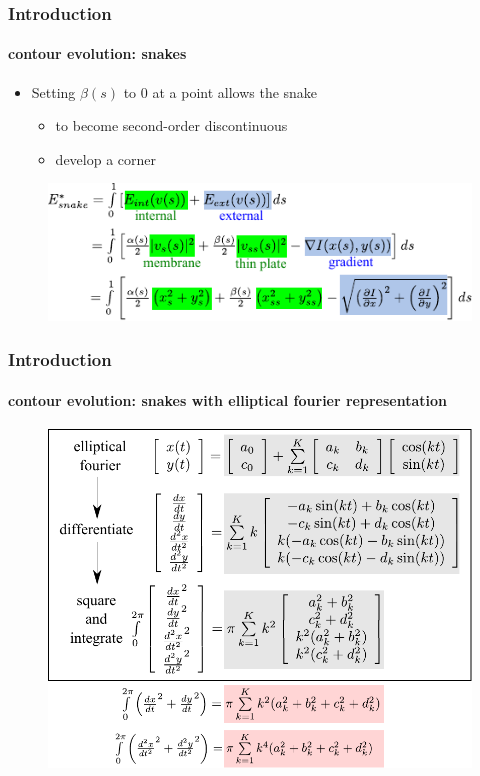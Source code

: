 \begin{frame}
\frametitle{Introduction}
\framesubtitle{contour evolution: snakes}
\logoCSIPCPL\mypagenum
	\begin{itemize}
		\item Setting $\beta(s)$ to 0 at a point allows the snake
			\begin{itemize}
				\item to become second-order discontinuous
				\item develop a corner
			\end{itemize}
	\end{itemize}
	\begin{figure}
		\includegraphics[width=1.0\textwidth]{figs/theory_curves_snakes.pdf}
	\end{figure}
\end{frame}


\begin{frame}
\frametitle{Introduction}
\framesubtitle{contour evolution: snakes with elliptical fourier representation}
\mypagenum
	\begin{figure}
		\includegraphics[width=1.0\textwidth]{figs/theory_curves_ellipticalFourierSnakes.pdf}
	\end{figure}
\end{frame}




